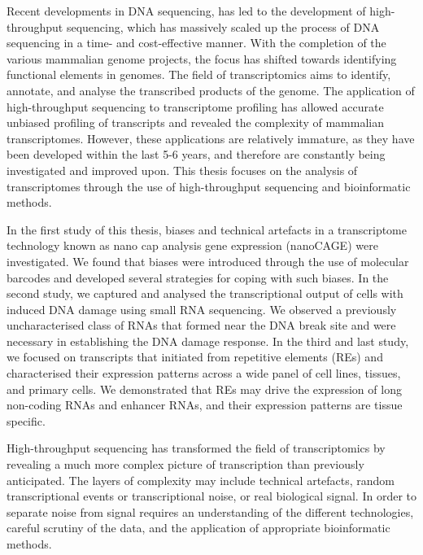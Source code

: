 Recent developments in DNA sequencing, has led to the development of high-throughput sequencing, which has massively scaled up the process of DNA sequencing in a time- and cost-effective manner. With the completion of the various mammalian genome projects, the focus has shifted towards identifying functional elements in genomes. The field of transcriptomics aims to identify, annotate, and analyse the transcribed products of the genome. The application of high-throughput sequencing to transcriptome profiling has allowed accurate unbiased profiling of transcripts and revealed the complexity of mammalian transcriptomes. However, these applications are relatively immature, as they have been developed within the last 5-6 years, and therefore are constantly being investigated and improved upon. This thesis focuses on the analysis of transcriptomes through the use of high-throughput sequencing and bioinformatic methods.

In the first study of this thesis, biases and technical artefacts in a transcriptome technology known as nano cap analysis gene expression (nanoCAGE) were investigated. We found that biases were introduced through the use of molecular barcodes and developed several strategies for coping with such biases. In the second study, we captured and analysed the transcriptional output of cells with induced DNA damage using small RNA sequencing. We observed a previously uncharacterised class of RNAs that formed near the DNA break site and were necessary in establishing the DNA damage response. In the third and last study, we focused on transcripts that initiated from repetitive elements (REs) and characterised their expression patterns across a wide panel of cell lines, tissues, and primary cells. We demonstrated that REs may drive the expression of long non-coding RNAs and enhancer RNAs, and their expression patterns are tissue specific.

High-throughput sequencing has transformed the field of transcriptomics by revealing a much more complex picture of transcription than previously anticipated. The layers of complexity may include technical artefacts, random transcriptional events or transcriptional noise, or real biological signal. In order to separate noise from signal requires an understanding of the different technologies, careful scrutiny of the data, and the application of appropriate bioinformatic methods.

